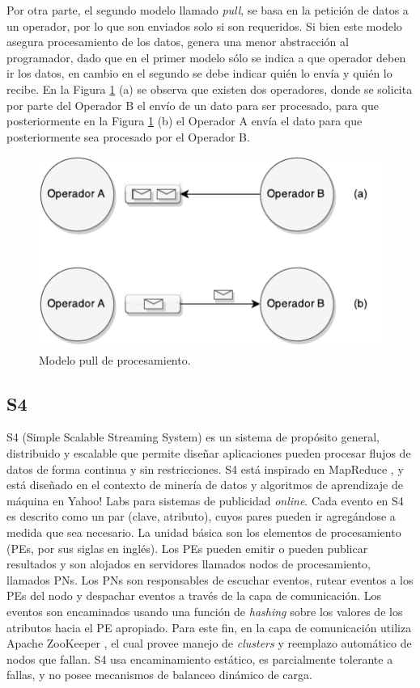 Por otra parte, el segundo modelo llamado \textit{pull}, se basa en la petición de datos a un operador, por lo que son enviados solo si son requeridos. Si bien este modelo asegura procesamiento de los datos, genera una menor abstracción al programador, dado que en el primer modelo sólo se indica a que operador deben ir los datos, en cambio en el segundo se debe indicar quién lo envía y quién lo recibe. En la Figura \ref{fig:sps-pull} (a) se observa que existen dos operadores, donde se solicita por parte del Operador B el envío de un dato para ser procesado, para que posteriormente en la Figura \ref{fig:sps-pull} (b) el Operador A envía el dato para que posteriormente sea procesado por el Operador B.

\begin{figure}[ht!]
  \centering
    \includegraphics[scale=1]{images/SPS-Pull.pdf}
  \caption{Modelo pull de procesamiento.}
  \label{fig:sps-pull}
\end{figure}

\subsection{S4}
S4 (Simple Scalable Streaming System) \citep{s4yahoo} es un sistema de propósito general, distribuido y escalable que permite diseñar aplicaciones pueden procesar flujos de datos de forma continua y sin restricciones. S4 está inspirado en MapReduce \citep{2010Lin}, y está diseñado en el contexto de minería de datos y algoritmos de aprendizaje de máquina en Yahoo! Labs para sistemas de publicidad \textsl{online}. Cada evento en S4 es descrito como un par (clave, atributo), cuyos pares pueden ir agregándose a medida que sea necesario. La unidad básica son los elementos de procesamiento (PEs, por sus siglas en inglés). Los PEs pueden emitir o pueden publicar resultados y son alojados en servidores llamados nodos de procesamiento, llamados PNs. Los PNs son responsables de escuchar eventos, rutear eventos a los PEs del nodo y despachar eventos a través de la capa de comunicación. Los eventos son encaminados usando una función de \textsl{hashing} sobre los valores de los atributos hacia el PE apropiado. Para este fin, en la capa de comunicación utiliza Apache ZooKeeper \citep{HuntKJR10}, el cual provee manejo de \textit{clusters} y reemplazo automático de nodos que fallan. S4 usa encaminamiento estático, es parcialmente tolerante a fallas, y no posee mecanismos de balanceo dinámico de carga.

